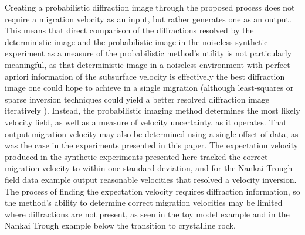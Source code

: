 Creating a probabilistic diffraction image through the proposed process does not require a migration velocity as an input, but rather generates one as an output.  This means that direct comparison of the diffractions resolved by the deterministic image  and the probabilistic image in the noiseless synthetic experiment as a measure of the probabilistic method's utility is not particularly meaningful, as that deterministic image in a noiseless environment with perfect apriori information of the subsurface velocity is effectively the best diffraction image one could hope to achieve in a single migration  (although least-squares or sparse inversion techniques could yield a better resolved diffraction image iteratively  \cite[]{merzlikin2020}).  Instead, the probabilistic imaging method determines the most likely velocity field, as well as a measure of velocity uncertainty, as it operates.  That output migration velocity may also be determined using a single offset of data, as was the case in the experiments presented in this paper.  The expectation velocity produced in the synthetic experiments presented here tracked the correct migration velocity to within one standard deviation, and for the Nankai Trough field data example  output reasonable velocities that resolved a velocity inversion. The process of finding the expectation velocity requires diffraction information, so the method's ability to determine correct migration velocities may be limited where diffractions are not present, as seen in the toy model example and in the Nankai Trough example below the transition to crystalline rock.   

